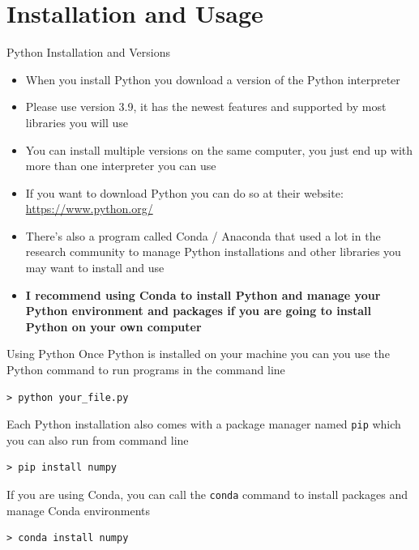 \documentclass[aspectratio=169]{beamer}
\begin{document}
\section{Installation and Usage}

\begin{frame}{Python Installation and Versions}
    \begin{itemize}
        \item When you install Python you download a version of the Python interpreter
        \item Please use version 3.9, it has the newest features and supported by most libraries you will use
        \item You can install multiple versions on the same computer, you just end up with more than one interpreter you can use
        \item If you want to download Python you can do so at their website: \url{https://www.python.org/}
        \item There's also a program called Conda / Anaconda that used a lot in the research community to manage Python installations and other libraries you may want to install and use
        \item \textbf{I recommend using Conda to install Python and manage your Python environment and packages if you are going to install Python on your own computer}
    \end{itemize}
\end{frame}

\begin{frame}[fragile]{Using Python}
    Once Python is installed on your machine you can you use the Python command to run programs in the command line
    \begin{lstlisting}
> python your_file.py
    \end{lstlisting}

    \vspace{\baselineskip}

    Each Python installation also comes with a package manager named \texttt{pip} which you can also run from command line
    \begin{lstlisting}
> pip install numpy
    \end{lstlisting}

    \vspace{\baselineskip}

    If you are using Conda, you can call the \texttt{conda} command to install packages and manage Conda environments
    \begin{lstlisting}
> conda install numpy
    \end{lstlisting}
\end{frame}
\end{document}
